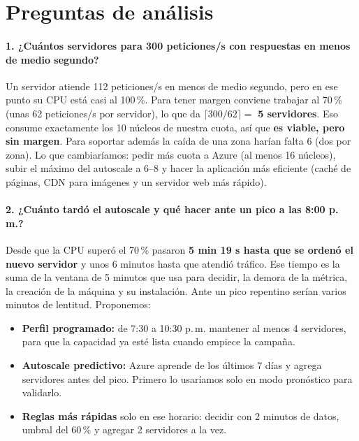 \section{Preguntas de análisis}
\paragraph{1. ¿Cuántos servidores para 300 peticiones/s con respuestas en menos de medio segundo?}
Un servidor atiende 112 peticiones/s en menos de medio segundo, pero en ese punto su CPU está
casi al 100\,\%. Para tener margen conviene trabajar al 70\,\% (unas 62 peticiones/s por
servidor), lo que da $\lceil 300/62\rceil = $ \textbf{5 servidores}. Eso consume exactamente los
10 núcleos de nuestra cuota, así que \textbf{es viable, pero sin margen}. Para soportar además la
caída de una zona harían falta 6 (dos por zona). Lo que cambiaríamos: pedir más cuota a Azure
(al menos 16 núcleos), subir el máximo del autoscale a 6--8 y hacer la aplicación más eficiente
(caché de páginas, CDN para imágenes y un servidor web más rápido).

\paragraph{2. ¿Cuánto tardó el autoscale y qué hacer ante un pico a las 8:00 p.\,m.?}
Desde que la CPU superó el 70\,\% pasaron \textbf{5 min 19 s hasta que se ordenó el nuevo servidor}
y unos 6 minutos hasta que atendió tráfico. Ese tiempo es la suma de la ventana de 5 minutos que
usa para decidir, la demora de la métrica, la creación de la máquina y su instalación. Ante un pico
repentino serían varios minutos de lentitud. Proponemos:
\begin{itemize}
  \item \textbf{Perfil programado:} de 7:30 a 10:30 p.\,m. mantener al menos 4 servidores, para que
        la capacidad ya esté lista cuando empiece la campaña.
  \item \textbf{Autoscale predictivo:} Azure aprende de los últimos 7 días y agrega servidores antes
        del pico. Primero lo usaríamos solo en modo pronóstico para validarlo.
  \item \textbf{Reglas más rápidas} solo en ese horario: decidir con 2 minutos de datos, umbral del
        60\,\% y agregar 2 servidores a la vez.
\end{itemize}


